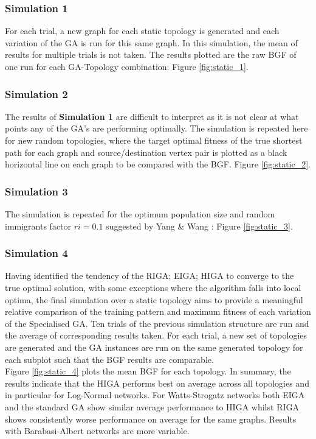 \documentclass[
	a4paper, %
	10pt, %
	unnumberedsections, %
	twoside, %
]{LTJournalArticle}
\begin{document}
\subsubsection{Simulation 1} For each trial, a new graph for each static topology is generated and each variation of the GA is run for this same graph. In this simulation, the mean of results for multiple trials is not taken. The results plotted are the raw BGF of one run for each GA-Topology combination: Figure \ref{fig:static_1}.\\
\subsubsection{Simulation 2} The results of \textbf{Simulation 1} are difficult to interpret as it is not clear at what points any of the GA's are performing optimally. The simulation is repeated here for new random topologies, where the target optimal fitness of the true shortest path for each graph and source/destination vertex pair is plotted as a black horizontal line on each graph to be compared with the BGF. Figure \ref{fig:static_2}. \\
\subsubsection{Simulation 3} The simulation is repeated for the optimum population size and random immigrants factor \(ri = 0.1\) suggested by Yang \& Wang \cite{yang:10}: Figure \ref{fig:static_3}. \\
\subsubsection{Simulation 4} Having identified the tendency of the RIGA; EIGA; HIGA to converge to the true optimal solution, with some exceptions where the algorithm falls into local optima, the final simulation over a static topology aims to provide a meaningful relative comparison of the training pattern and maximum fitness of each variation of the Specialised GA. Ten trials of the previous simulation structure are run and the average of corresponding results taken. For each trial, a new set of topologies are generated and the GA instances are run on the same generated topology for each subplot such that the BGF results are comparable.\\
Figure \ref{fig:static_4} plots the mean BGF for each topology. In summary, the results indicate that the HIGA performs best on average across all topologies and in particular for Log-Normal networks. For Watts-Strogatz networks both EIGA and the standard GA show similar average performance to HIGA whilst RIGA shows consistently worse performance on average for the same graphs. Results with Barabasi-Albert networks are more variable. \\
\end{document}

